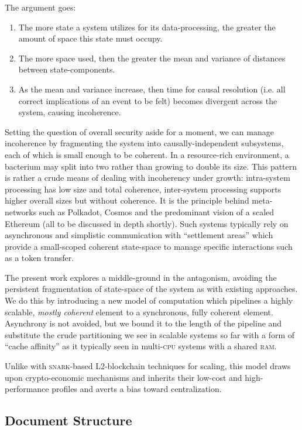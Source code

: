 The argument goes:
\begin{enumerate}
  \item The more state a system utilizes for its data-processing, the greater the amount of space this state must occupy.
  \item The more space used, then the greater the mean and variance of distances between state-components.
  \item As the mean and variance increase, then time for causal resolution (i.e. all correct implications of an event to be felt) becomes divergent across the system, causing incoherence.
\end{enumerate}

Setting the question of overall security aside for a moment, we can manage incoherence by fragmenting the system into causally-independent subsystems, each of which is small enough to be coherent. In a resource-rich environment, a bacterium may split into two rather than growing to double its size. This pattern is rather a crude means of dealing with incoherency under growth: intra-system processing has low size and total coherence, inter-system processing supports higher overall sizes but without coherence. It is the principle behind meta-networks such as Polkadot, Cosmos and the predominant vision of a scaled Ethereum (all to be discussed in depth shortly). Such systems typically rely on asynchronous and simplistic communication with ``settlement areas'' which provide a small-scoped coherent state-space to manage specific interactions such as a token transfer.

The present work explores a middle-ground in the antagonism, avoiding the persistent fragmentation of state-space of the system as with existing approaches. We do this by introducing a new model of computation which pipelines a highly scalable, \emph{mostly coherent} element to a synchronous, fully coherent element. Asynchrony is not avoided, but we bound it to the length of the pipeline and substitute the crude partitioning we see in scalable systems so far with a form of ``cache affinity'' as it typically seen in multi-\textsc{cpu} systems with a shared \textsc{ram}.

Unlike with \textsc{snark}-based L2-blockchain techniques for scaling, this model draws upon crypto-economic mechanisms and inherits their low-cost and high-performance profiles and averts a bias toward centralization.

\subsection{Document Structure}

